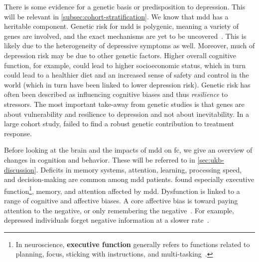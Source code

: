 There is some evidence for a genetic basis or predisposition to depression.
This will be relevant in \cref{subsec:cohort-stratification}.
We know that \gls{mdd} has a heritable component.
Genetic risk for \gls{mdd} is polygenic, meaning a variety of genes are involved, and the exact mechanisms are yet to be uncovered~\parencite{Hyman2014}.
This is likely due to the heterogeneity of depressive symptoms as well.
Moreover, much of depression risk may be due to other genetic factors.
Higher overall cognitive function, for example, could lead to higher socioeconomic status, which in turn could lead to a healthier diet and an increased sense of safety and control in the world (which in turn have been linked to lower depression risk).
Genetic risk has often been described as influencing cognitive biases and thus \emph{resilience} to stressors.
The most important take-away from genetic studies is that genes are about vulnerability and resilience to depression and not about inevitability.
%
In a large cohort study, \textcite{Garcia-Gonzalez2017} failed to find a robust genetic contribution to treatment response.

Before looking at the brain and the impacts of \gls{mdd} on \gls{fc}, we give an overview of changes in cognition and behavior.
These will be referred to in \cref{sec:ukb-discussion}.
Deficits in memory systems, attention, learning, processing speed, and decision-making are common among \gls{mdd} patients.
\textcite{Rock2014} found especially executive function\footnote{In neuroscience, \textbf{executive function} generally refers to functions related to planning, focus, sticking with instructions, and multi-tasking~\parencite{Banich2009}.}, memory, and attention affected by \gls{mdd}.
Dysfunction is linked to a range of cognitive and affective biases.
A core affective bias is toward paying attention to the negative, or only remembering the negative~\parencite{Pulcu2017}.
For example, depressed individuals forget negative information at a slower rate~\parencite{Power2000, Joormann2010}.


